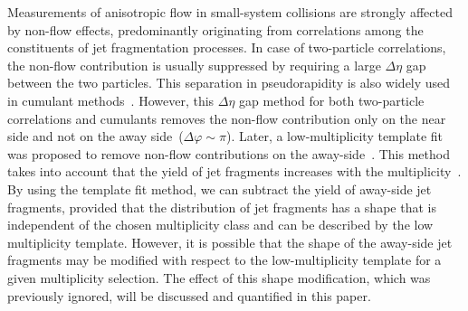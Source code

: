 Measurements of anisotropic flow in small-system collisions are strongly affected by non-flow effects, predominantly originating from correlations among the constituents of jet fragmentation processes.
In case of two-particle correlations, the non-flow contribution is usually suppressed by requiring a large $\Delta\eta$ gap between the two particles. This separation in pseudorapidity is also widely used in cumulant methods~\cite{Bilandzic:2010jr, Acharya:2019vdf}. However, this $\Delta\eta$ gap method for both two-particle correlations and cumulants removes the non-flow contribution only on the near side and not on the away side~($\Delta\varphi\sim\pi$). Later, a low-multiplicity template fit was proposed to remove non-flow contributions on the away-side~\cite{ATLAS:2015hzw, ATLAS:2016yzd, ATLAS:2018ngv}. This method takes into account that the yield of jet fragments increases with the multiplicity~\cite{CMS:2013ycn, ALICE:2013tla, ALICE:2014mas}.
By using the template fit method, we can subtract the yield of away-side jet fragments, provided that the distribution of jet fragments has a shape that is independent of the chosen multiplicity class and can be described by the low multiplicity template. 
However, it is possible that the shape of the away-side jet fragments may be modified with respect to the low-multiplicity template for a given multiplicity selection. The effect of this shape modification, which was previously ignored, will be discussed and quantified in this paper.


